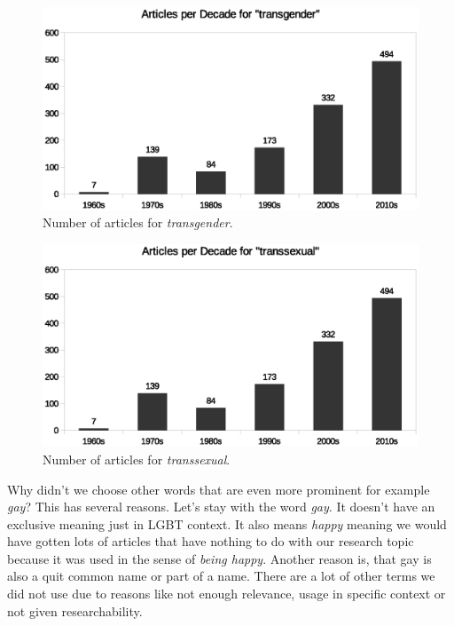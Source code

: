 \documentclass[10pt,a4paper,twocolumn]{scrartcl}
\begin{document}
\begin{figure}
\includegraphics[width=\columnwidth]{figures/transgender_decade}
\caption{Number of articles for \textit{transgender}.} \label{fig:transgender}
\end{figure}

\begin{figure}
\includegraphics[width=\columnwidth]{figures/transsexual_decade}
\caption{Number of articles for \textit{transsexual}.} \label{fig:transsexual}
\end{figure}


Why didn't we choose other words that are even more prominent for example \textit{gay}? This has several reasons. Let's stay with the word \textit{gay}. It doesn't have an exclusive meaning just in LGBT context. It also means \textit{happy} meaning we would have gotten lots of articles that have nothing to do with our research topic because it was used in the sense of \textit{being happy}. Another reason is, that gay is also a quit common name or part of a name. 
There are a lot of other terms we did not use due to reasons like not enough relevance, usage in specific context or not given researchability. 
\end{document}

